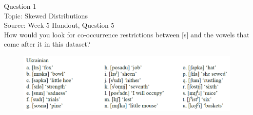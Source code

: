 \documentclass[12pt]{article}
\begin{document}
\begin{center}
\textbf{{\color{violet}{\HUGE 20201013 Tuesday\\}}}

\textbf{{\color{violet}{\HUGE ALL EXAMS\\}}}

\end{center}
\newpage

\begin{center}
\textbf{{\color{blue}{\HUGE START OF EXAM\\}}}

\textbf{{\color{blue}{\HUGE Student ID: empty\\}}}

\textbf{{\color{blue}{\HUGE 9:00\\}}}

\end{center}
\newpage

\begin{center}
\textbf{{\color{blue}{\HUGE START OF EXAM\\}}}

\textbf{{\color{blue}{\HUGE Student ID: 48772\\}}}

\textbf{{\color{blue}{\HUGE 9:10\\}}}

\end{center}
\newpage

{\large Question 1}\\

Topic: Skewed Distributions\\
Source: Week 5 Handout, Question 5\\

How would you look for co-occurrence restrictions between [s] and the vowels that come after it in this dataset?\\

\begin{figure}[H]
\includegraphics{../images/ukrainian.png}
\end{figure}

\newpage
\end{document}
